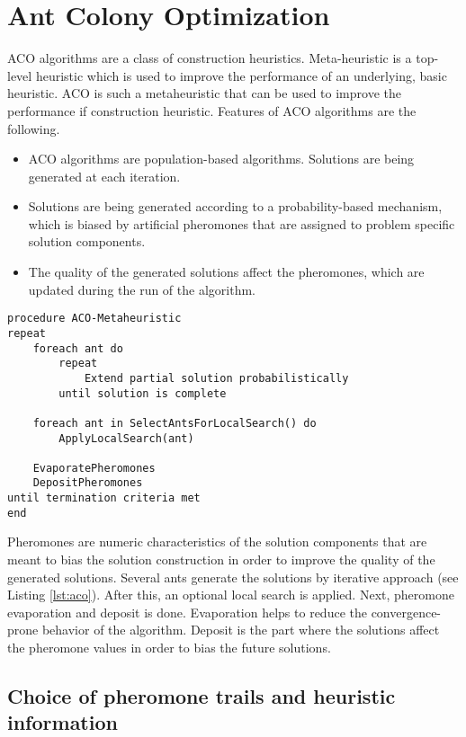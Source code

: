 \section{Ant Colony Optimization}

ACO algorithms are a class of construction heuristics. Meta-heuristic is a top-level heuristic which is used to improve the performance of an underlying, basic heuristic. ACO is such a metaheuristic that can be used to improve the performance if construction heuristic. Features of ACO algorithms are the following.

\begin{itemize}
\item ACO algorithms are population-based algorithms. Solutions are being generated at each iteration.
\item Solutions are being generated according to a probability-based mechanism, which is biased by artificial pheromones that are assigned to problem specific solution components.
\item The quality of the generated solutions affect the pheromones, which are updated during the run of the algorithm.
\end{itemize}


\begin{minipage}[c, breaklines=true]{0.95\textwidth}
\begin{lstlisting}[caption={General ACO pseudo-code}, label={lst:aco}]
procedure ACO-Metaheuristic
repeat
	foreach ant do
		repeat
			Extend partial solution probabilistically
		until solution is complete
	
	foreach ant in SelectAntsForLocalSearch() do
		ApplyLocalSearch(ant)
	
	EvaporatePheromones
	DepositPheromones
until termination criteria met
end
\end{lstlisting}
\end{minipage}

Pheromones are numeric characteristics of the solution components that are meant to bias the solution construction in order to improve the quality of the generated solutions. Several ants generate the solutions by iterative approach (see Listing \ref{lst:aco}). After this, an optional local search is applied. Next, pheromone evaporation and deposit is done. Evaporation helps to reduce the convergence-prone behavior of the algorithm. Deposit is the part where the solutions affect the pheromone values in order to bias the future solutions.

\subsection{Choice of pheromone trails and heuristic information}


